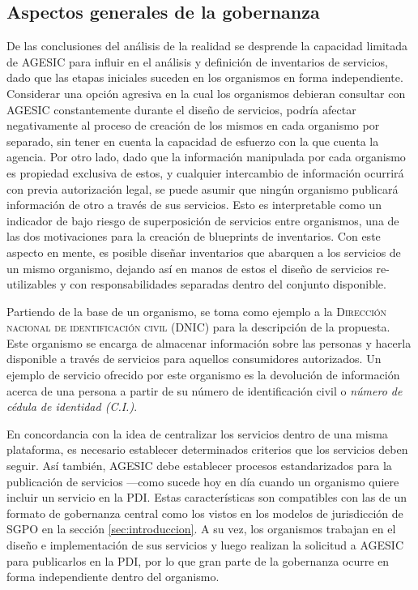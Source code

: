 \documentclass[11pt]{article}
\begin{document}
		\subsection{Aspectos generales de la gobernanza}
			De las conclusiones del análisis de la realidad se desprende la capacidad limitada de AGESIC para influir en el análisis y definición de inventarios de servicios, dado que las etapas iniciales suceden en los organismos en forma independiente. Considerar una opción agresiva en la cual los organismos debieran consultar con AGESIC constantemente durante el diseño de servicios, podría afectar negativamente al proceso de creación de los mismos en cada organismo por separado, sin tener en cuenta la capacidad de esfuerzo con la que cuenta la agencia. Por otro lado, dado que la información manipulada por cada organismo es propiedad exclusiva de estos, y cualquier intercambio de información ocurrirá con previa autorización legal, se puede asumir que ningún organismo publicará información de otro a través de sus servicios. Esto es interpretable como un indicador de bajo riesgo de superposición de servicios entre organismos, una de las dos motivaciones para la creación de blueprints de inventarios. Con este aspecto en mente, es posible diseñar inventarios que abarquen a los servicios de un mismo organismo, dejando así en manos de estos el diseño de servicios re-utilizables y con responsabilidades separadas dentro del conjunto disponible.

			Partiendo de la base de un organismo, se toma como ejemplo a la \textsc{Dirección nacional de identificación civil (DNIC)} para la descripción de la propuesta. Este organismo se encarga de almacenar información sobre las personas y hacerla disponible a través de servicios para aquellos consumidores autorizados. Un ejemplo de servicio ofrecido por este organismo es la devolución de información acerca de una persona a partir de su número de identificación civil o \emph{número de cédula de identidad (C.I.)}.

			En concordancia con la idea de centralizar los servicios dentro de una misma plataforma, es necesario establecer determinados criterios que los servicios deben seguir. Así también, AGESIC debe establecer procesos estandarizados para la publicación de servicios —como sucede hoy en día cuando un organismo quiere incluir un servicio en la PDI. Estas características son compatibles con las de un formato de gobernanza central como los vistos en los modelos de jurisdicción de SGPO en la sección \ref{sec:introduccion}. A su vez, los organismos trabajan en el diseño e implementación de sus servicios y luego realizan la solicitud a AGESIC para publicarlos en la PDI, por lo que gran parte de la gobernanza ocurre en forma independiente dentro del organismo.
\end{document}
